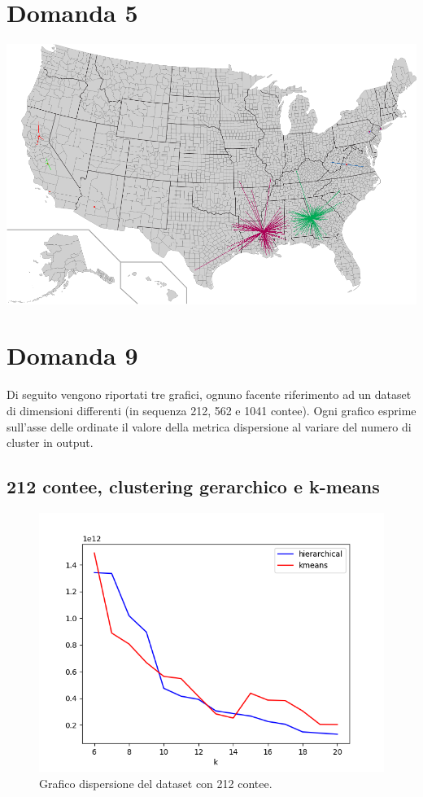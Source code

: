 \documentclass{article}
\begin{document}
\section*{Domanda 5}
\includegraphics[width=1.0\linewidth, valign=t]{figures/Domanda5}

\section*{Domanda 9}
Di seguito vengono riportati tre grafici, ognuno facente riferimento ad un dataset di dimensioni differenti (in sequenza 212, 562 e 1041 contee). 
Ogni grafico esprime sull'asse delle ordinate il valore della metrica dispersione al variare del numero di cluster in output. \newline
\subsection*{212 contee, clustering gerarchico e k-means}
\begin{figure}[H]
	\hspace*{-1cm}\begin{minipage}{0.55\linewidth}
		\centering
			
	\end{minipage}
	\begin{minipage}{0.7\linewidth}
		\includegraphics[width=1.0\linewidth, valign=t]{figures/output562}
		\caption*{Grafico dispersione del dataset con 212 contee.}
	\end{minipage}
\end{figure}
\end{document}
